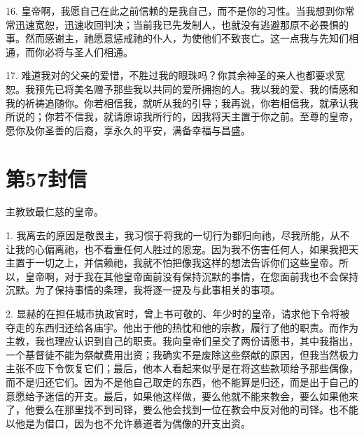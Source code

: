 16. 皇帝啊，我愿自己在此之前信赖的是我自己，而不是你的习性。当我想到你常常迅速宽恕，迅速收回判决；当前我已先发制人，也就没有逃避那原不必畏惧的事。然而感谢主，祂愿意惩戒祂的仆人，为使他们不致丧亡。这一点我与先知们相通，而你必将与圣人们相通。\par

17. 难道我对的父亲的爱惜，不胜过我的眼珠吗？你其余神圣的亲人也都要求宽恕。我预先已将美名赠予那些我以共同的爱所拥抱的人。我以我的爱、我的情感和我的祈祷追随你。你若相信我，就听从我的引导；我再说，你若相信我，就承认我所说的；你若不信我，就请原谅我所行的，因我将天主置于你之前。至尊的皇帝，愿你及你圣善的后裔，享永久的平安，满备幸福与昌盛。\par



\section{第57封信}

\par

主教致最仁慈的皇帝。\par

1. 我离去的原因是敬畏主，我习惯于将我的一切行为都归向祂，尽我所能，从不让我的心偏离祂，也不看重任何人胜过的恩宠。因为我不伤害任何人，如果我把天主置于一切之上，并信赖祂，我就不怕把像我这样的想法告诉你们这些皇帝。所以，皇帝啊，对于我在其他皇帝面前没有保持沉默的事情，在您面前我也不会保持沉默。为了保持事情的条理，我将逐一提及与此事相关的事项。\par

2. 显赫的在担任城市执政官时，曾上书可敬的、年少时的皇帝，请求他下令将被夺走的东西归还给各庙宇。他出于他的热忱和他的宗教，履行了他的职责。而作为主教，我也理应认识到自己的职责。我向皇帝们呈交了两份请愿书，其中我指出，一个基督徒不能为祭献费用出资；我确实不是废除这些祭献的原因，但我当然极力主张不应下令恢复它们；最后，他本人看起来似乎是在将这些款项给予那些偶像，而不是归还它们。因为不是他自己取走的东西，他不能算是归还，而是出于自己的意愿给予迷信的开支。最后，如果他这样做，要么他就不能来教会，要么如果他来了，他要么在那里找不到司铎，要么他会找到一位在教会中反对他的司铎。也不能以他是为借口，因为也不允许慕道者为偶像的开支出资。\par

